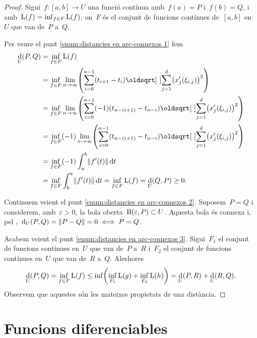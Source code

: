 \documentclass[../../main.tex]{subfiles}
\begin{document}
    \begin{proof}
        Sigui~\(f\colon[a,b]\to U\) una funció contínua amb~\(f(a)=P\) i~\(f(b)=Q\), i  amb~\(\operatorname*{L}(f)=\inf_{f\in F}\operatorname*{L}(f)\), on~\(F\) és el conjunt de funcions contínues de~\([a,b]\) en~\(U\) que van de~\(P\) a~\(Q\).

        Per veure el punt \eqref{enum:distancies en arc-connexos 1} fem
        \begin{align*}
        \Dist_{U}(P,Q)&=\inf_{f\in F}\Long(f)\\
        &=\inf_{f\in F}\lim_{n\to\infty}\left(\sum_{i=0}^{n-1}(t_{i+1}-t_{i})\sqrt{\sum_{j=1}^{d}\left(x_{j}'(\xi_{i,j})\right)^2}\right)\\
        &=\inf_{f\in F}\lim_{n\to\infty}\left(\sum_{i=0}^{n-1}(-1)(t_{n-(i+1)}-t_{n-i})\sqrt{\sum_{j=1}^{d}\left(x_{j}'(\xi_{i,j})\right)^2}\right)\\
        &=\inf_{f\in F}(-1)\lim_{n\to\infty}\left(\sum_{i=0}^{n-1}(t_{n-(i+1)}-t_{n-i})\sqrt{\sum_{j=1}^{d}\left(x_{j}'(\xi_{i,j})\right)^2}\right)\\
        &=\inf_{f\in F}(-1)\int_{a}^{b}\norm{f'(t)}\diff t\\
        &=\inf_{f\in F}\int_{b}^{a}\norm{f'(t)}\diff t=\inf_{f\in F}\Long(f)=\Dist_{U}(Q,P)\geq0.
        \end{align*}

        Continuem veient el punt \eqref{enum:distancies en arc-connexos 2}.
        Suposem~\(P=Q\) i considerem, amb~\(\varepsilon>0\), la bola oberta~\(\operatorname{B}(\varepsilon,P)\subset U\).
        Aquesta bola és connexa i, pel \corollari{} ,~\(\Dist_{U}(P,Q)=\norm{P-Q}=0\sii P=Q\).%

        Acabem veient el punt \eqref{enum:distancies en arc-connexos 3}.
        Sigui~\(F_{1}\) el conjunt de funcions contínues en~\(U\) que van de~\(P\) a~\(R\) i~\(F_{2}\) el conjunt de funcions contínues en~\(U\) que van de~\(R\) a~\(Q\).
        Aleshores
        \begin{displaymath}
        \Dist_{U}(P,Q)=\inf_{f\in F}\Long(f)\leq\inf\left(\inf_{F_{1}}\Long(g)+\inf_{F_{2}}\Long(h)\right)=\Dist_{U}(P,R)+\Dist_{U}(R,Q).
        \end{displaymath}%
        Observem que aquestes són les mateixes propietats de una distància.
    \end{proof}
\section{Funcions diferenciables}
\end{document}

